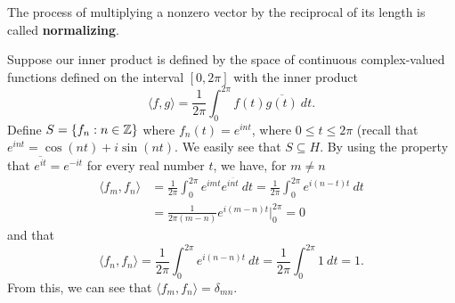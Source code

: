 \begin{definition}[Normalizing]
    The process of multiplying a nonzero vector by the reciprocal of its length is called \textbf{normalizing}.
\end{definition}

\begin{eg}
    Suppose our inner product is defined by the space of continuous complex-valued functions defined on the interval \( [0, 2 \pi] \) with the inner product
    \[  \langle f , g \rangle = \frac{ 1 }{ 2 \pi  }  \int_{ 0 }^{ 2 \pi  } f(t) \overline{g(t)} \ dt. \]
    Define \( S = \{ {f}_{n} : n \in \mathbb{Z}  \}  \) where \( {f}_{n}(t) = e^{i n t} \), where \( 0 \leq t \leq 2 \pi \) (recall that \( e^{i n t } = \cos(nt) + i \sin(nt) \). We easily see that \( S \subseteq H   \). By using the property that \( \overline{e^{it  }} = e^{-it  } \) for every real number \( t  \), we have, for \( m \neq n  \)
    \begin{align*}
        \langle {f}_{m}  , {f}_{n} \rangle &= \frac{ 1 }{ 2 \pi  } \int_{ 0  }^{  2 \pi  } e^{imt} e^{\overline{i n t }}  \ dt = \frac{ 1 }{ 2 \pi  }  \int_{ 0 }^{ 2 \pi  } e^{i (n-t) t } \ dt \\
                                           &= \frac{ 1 }{ 2 \pi (m-n) }  e^{i (m-n) t } \Big|_{0}^{2\pi} = 0
    \end{align*}
    and that 
    \[  \langle {f}_{n} , {f}_{n} \rangle = \frac{ 1 }{ 2 \pi  }  \int_{ 0 }^{ 2 \pi } e^{i(n-n)t}  \ dt = \frac{ 1 }{ 2\pi } \int_{ 0 }^{ 2 \pi  }  1  \ dt = 1. \]
    From this, we can see that \( \langle {f}_{m} , {f}_{n} \rangle =  {\delta}_{mn} \).
\end{eg}
